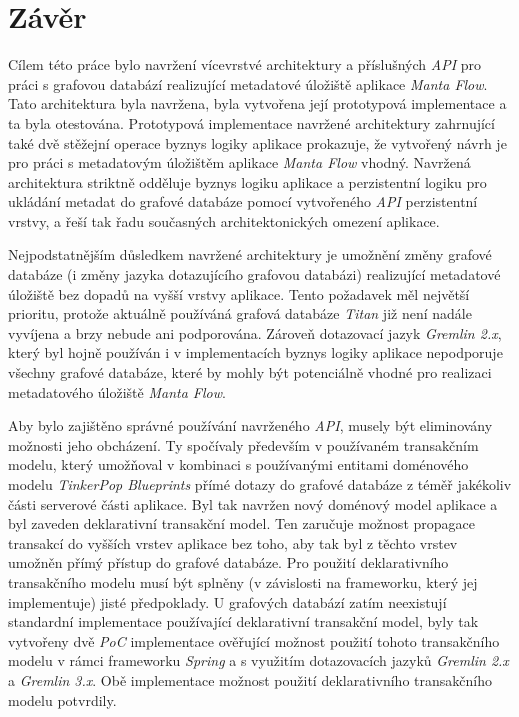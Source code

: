 \chapter{Závěr}
Cílem této práce bylo navržení vícevrstvé architektury a příslušných \textit{API} pro práci s grafovou databází realizující metadatové úložiště aplikace \textit{Manta Flow}. Tato architektura byla navržena, byla vytvořena její prototypová implementace a ta byla otestována. Prototypová implementace navržené architektury zahrnující také dvě stěžejní operace byznys logiky aplikace prokazuje, že vytvořený návrh je pro práci s metadatovým úložištěm aplikace \textit{Manta Flow} vhodný. Navržená architektura striktně odděluje byznys logiku aplikace a perzistentní logiku pro ukládání metadat do grafové databáze pomocí vytvořeného \textit{API} perzistentní vrstvy, a řeší tak řadu současných architektonických omezení aplikace.

Nejpodstatnějším důsledkem navržené architektury je umožnění změny grafové databáze (i změny jazyka dotazujícího grafovou databázi) realizující metadatové úložiště bez dopadů na vyšší vrstvy aplikace. Tento požadavek měl největší prioritu, protože aktuálně používáná grafová databáze \textit{Titan} již není nadále vyvíjena a brzy nebude ani podporována. Zároveň dotazovací jazyk \textit{Gremlin 2.x}, který byl hojně používán i v implementacích byznys logiky aplikace nepodporuje všechny grafové databáze, které by mohly být potenciálně vhodné pro realizaci metadatového úložiště \textit{Manta Flow}.

Aby bylo zajištěno správné používání navrženého \textit{API}, musely být eliminovány možnosti jeho obcházení. Ty spočívaly především v používaném transakčním modelu, který umožňoval v kombinaci s používanými entitami doménového modelu \textit{TinkerPop Blueprints} přímé dotazy do grafové databáze z téměř jakékoliv části serverové části aplikace. Byl tak navržen nový doménový model aplikace a byl zaveden deklarativní transakční model. Ten zaručuje možnost propagace transakcí do vyšších vrstev aplikace bez toho, aby tak byl z těchto vrstev umožněn přímý přístup do grafové databáze. Pro použití deklarativního transakčního modelu musí být splněny (v závislosti na frameworku, který jej implementuje) jisté předpoklady. U grafových databází zatím neexistují standardní implementace používající deklarativní transakční model, byly tak vytvořeny dvě \textit{PoC} implementace ověřující možnost použití tohoto transakčního modelu v rámci frameworku \textit{Spring} a s využitím dotazovacích jazyků \textit{Gremlin 2.x} a \textit{Gremlin 3.x}. Obě implementace možnost použití deklarativního transakčního modelu potvrdily.

